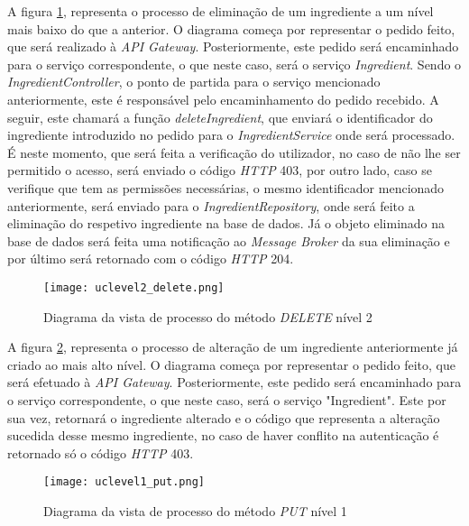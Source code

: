 A figura \ref{fig:processDELETE2}, representa o processo de eliminação de um ingrediente a um nível mais baixo do que a anterior. O diagrama começa por representar o pedido feito, que será realizado à \textit{API Gateway}. Posteriormente, este pedido será encaminhado para o serviço correspondente, o que neste caso, será o serviço \textit{Ingredient}. Sendo o \textit{IngredientController}, o ponto de partida para o serviço mencionado anteriormente, este é responsável pelo encaminhamento do pedido recebido. A seguir, este chamará a função \textit{deleteIngredient}, que enviará o identificador do ingrediente introduzido no pedido para o \textit{IngredientService} onde será processado. É neste momento, que será feita a verificação do utilizador, no caso de não lhe ser permitido o acesso, será enviado o código \textit{HTTP} 403, por outro lado, caso se verifique que tem as permissões necessárias, o mesmo identificador mencionado anteriormente, será enviado para o \textit{IngredientRepository}, onde será feito a eliminação do respetivo ingrediente na base de dados. Já o objeto eliminado na base de dados será feita uma notificação ao \textit{Message Broker} da sua eliminação e por último será retornado com o código \textit{HTTP} 204.

\begin{figure}[H]
    \centering
    \texttt{[image: uclevel2\_delete.png]}
    \caption{Diagrama da vista de processo do método \textit{DELETE} nível 2}
    \label{fig:processDELETE2}
\end{figure}


A figura \ref{fig:processPUT1}, representa o processo de alteração de um ingrediente anteriormente já criado ao mais alto nível. O diagrama começa por representar o pedido feito, que será efetuado à \textit{API Gateway}. Posteriormente, este pedido será encaminhado para o serviço correspondente, o que neste caso, será o serviço "Ingredient". Este por sua vez, retornará o ingrediente alterado e o código que representa a alteração sucedida desse mesmo ingrediente, no caso de haver conflito na autenticação é retornado só o código \textit{HTTP} 403.

\begin{figure}[H]
    \centering
    \texttt{[image: uclevel1\_put.png]}
    \caption{Diagrama da vista de processo do método \textit{PUT} nível 1}
    \label{fig:processPUT1}
\end{figure}

